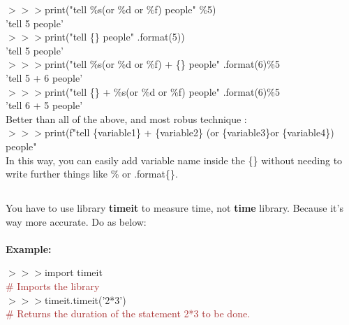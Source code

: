 \documentclass[a4paper,18pt]{article}
\begin{document}
$>>>$print("tell \%s(or \%d or \%f) people" \%5)\\

\hspace{14pt} 'tell 5 people'\\

$>>>$print("tell \{\} people" .format(5))\\

\hspace{14pt} 'tell 5 people'\\

$>>>$print("tell \%s(or \%d or \%f) + \{\} people" .format(6)\%5\\

\hspace{14pt} 'tell 5 + 6 people'\\

$>>>$print("tell \{\} + \%s(or \%d or \%f) people" .format(6)\%5\\

\hspace{14pt} 'tell 6 + 5 people'\\

Better than all of the above, and most robus technique :\\

$>>>$print(f"tell \{variable1\} + \{variable2\} (or \{variable3\}or \{variable4\}) people"\\

In this way, you can easily add variable name inside the \{\} without needing to write further things like \% or .format\{\}.


\subsection{\colorbox {matgreen}{\color{white}{\large Measuring Time}}}

You have to use library \textbf{timeit} to measure time, not \textbf{time} library. Because it's way more accurate. Do as below:\\\\
\textbf{Example:\\}

$>>>$import timeit\\{\textcolor{brown}{\# Imports the library}}\\

$>>>$timeit.timeit('2*3')\\{\textcolor{brown}{\# Returns the duration of the statement 2*3 to be done.}}\\
\end{document}
